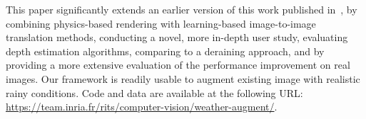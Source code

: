 This paper significantly extends an earlier version of this work published in~\cite{halder2019physics}, by combining physics-based rendering with learning-based image-to-image translation methods, conducting a novel, more in-depth user study, evaluating depth estimation algorithms, comparing to a deraining approach, and by providing a more extensive evaluation of the performance improvement on real images. Our framework is readily usable to augment existing image with realistic rainy conditions. Code and data are available at the following URL: \url{https://team.inria.fr/rits/computer-vision/weather-augment/}.